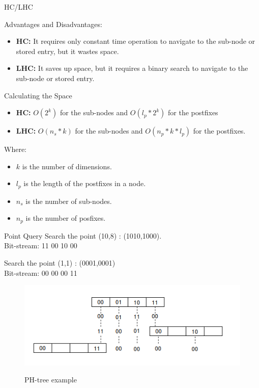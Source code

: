 \documentclass{beamer}
\begin{document}
\begin{frame}{HC/LHC}
\begin{block}{Advantages and Disadvantages:}
 \begin{itemize}
  \item \textbf{HC:} It requires only constant time operation to navigate to the sub-node or stored entry, but it wastes space.
  \item \textbf{LHC:} It saves up space, but it requires a binary search to navigate to the sub-node or stored entry.
 \end{itemize}
\end{block}
 \begin{block}{Calculating the Space}
  \begin{itemize}
   \item \textbf{HC:} $O(2^{k})$ for the sub-nodes and $O(l_{p} * 2^{k})$ for the postfixes
   \item \textbf{LHC:} $O(n_{s} * k)$ for the sub-nodes and $O(n_{p} * k * l_{p})$ for the postfixes.
  \end{itemize}
  Where:
  \begin{itemize}
   \item $k$ is the number of dimensions.
   \item $l_{p}$ is the length of the postfixes in a node.
   \item $n_{s}$ is the number of sub-nodes.
   \item $n_{p}$ is the number of posfixes.
  \end{itemize}
 \end{block}
\end{frame}

\begin{frame}{Point Query}
  Search the point (10,8) : (1010,1000). \\
  Bit-stream: 11 00 10 00 \par
  
  Search the point (1,1) : (0001,0001) \\
  Bit-stream: 00 00 00 11

  \begin{figure}
   \centering
   \includegraphics[scale = 0.5]{9.png}
   \label{fig9}
   \caption{PH-tree example}
  \end{figure}
\end{frame}
\end{document}

